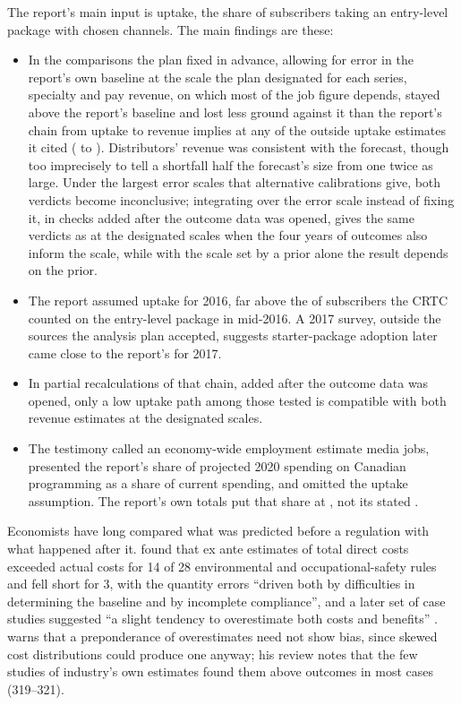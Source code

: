 The report's main input is uptake, the share of subscribers taking an entry-level package with chosen channels. The main findings are these:
\begin{itemize}
\item In the comparisons the plan fixed in advance, allowing for error in the report's own baseline at the scale the plan designated for each series, specialty and pay revenue, on which most of the job figure depends, stayed above the report's baseline and lost less ground against it than the report's chain from uptake to revenue implies at any of the outside uptake estimates it cited (\lttvCitedUptakeLow{} to \lttvCitedUptakeHigh{}). Distributors' revenue was consistent with the forecast, though too imprecisely to tell a shortfall half the forecast's size from one twice as large. Under the largest error scales that alternative calibrations give, both verdicts become inconclusive; integrating over the error scale instead of fixing it, in checks added after the outcome data was opened, gives the same verdicts as at the designated scales when the four years of outcomes also inform the scale, while with the scale set by a prior alone the result depends on the prior.
\item The report assumed \lttvByopSixteen{} uptake for 2016, far above the \lttvUptakeJuneShare{} of subscribers the CRTC counted on the entry-level package in mid-2016. A 2017 survey, outside the sources the analysis plan accepted, suggests starter-package adoption later came close to the report's \lttvByopSeventeen{} for 2017.
\item In partial recalculations of that chain, added after the outcome data was opened, only a low uptake path among those tested is compatible with both revenue estimates at the designated scales.
\item The testimony called an economy-wide employment estimate media jobs, presented the report's share of projected 2020 spending on Canadian programming as a share of current spending, and omitted the uptake assumption. The report's own totals put that share at \lttvCPEShareTwenty{}, not its stated \lttvCPEShareStated{}.
\end{itemize}

Economists have long compared what was predicted before a regulation with what happened after it. \textcite[297]{harrington2000accuracy} found that ex ante estimates of total direct costs exceeded actual costs for 14 of 28 environmental and occupational-safety rules and fell short for 3, with the quantity errors \enquote{driven both by difficulties in determining the baseline and by incomplete compliance}, and a later set of case studies suggested \enquote{a slight tendency to overestimate both costs and benefits} \citep[285]{morgenstern2018retrospective}. \textcite[322]{simpson2014overestimate} warns that a preponderance of overestimates need not show bias, since skewed cost distributions could produce one anyway; his review notes that the few studies of industry's own estimates found them above outcomes in most cases (319--321).

